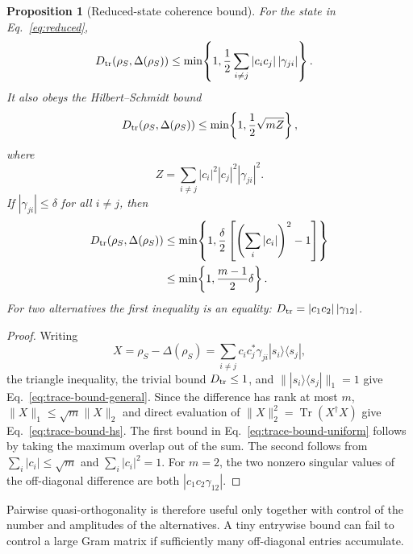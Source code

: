 \documentclass[aps,pra,reprint,superscriptaddress,nofootinbib,longbibliography]{revtex4-2}
\newtheorem{proposition}{Proposition}
\newcommand{\bra}[1]{\langle #1 |}
\newcommand{\ket}[1]{| #1 \rangle}
\newcommand{\Tr}{\operatorname{Tr}}
\begin{document}
\begin{proposition}[Reduced-state coherence bound]
\label{prop:trace-bound}
For the state in Eq.~\eqref{eq:reduced},
\begin{align}
 D_{\rm tr}\!\left(\rho_S,\Delta(\rho_S)\right)
 &\leq
 \min\!\left\{1,
 \frac12\sum_{i\neq j}|c_i c_j|\,|\gamma_{ji}|\right\}.
 \label{eq:trace-bound-general}
\end{align}
It also obeys the Hilbert--Schmidt bound
\begin{equation}
 D_{\rm tr}\!\left(\rho_S,\Delta(\rho_S)\right)
 \leq \min\!\left\{1,\frac12\sqrt{mZ}\right\},
 \label{eq:trace-bound-hs}
\end{equation}
where
\begin{equation}
 Z=\sum_{i\neq j}|c_i|^2|c_j|^2|\gamma_{ji}|^2.
 \label{eq:collective-coherence}
\end{equation}
If $|\gamma_{ji}|\leq\delta$ for all $i\neq j$, then
\begin{equation}
\begin{aligned}
 D_{\rm tr}\!\left(\rho_S,\Delta(\rho_S)\right)
 &\leq
 \min\!\left\{1,\frac{\delta}{2}
 \left[\left(\sum_i|c_i|\right)^2-1\right]
 \right\} \\
 &\leq \min\!\left\{1,\frac{m-1}{2}\delta\right\}.
 \label{eq:trace-bound-uniform}
\end{aligned}
\end{equation}
For two alternatives the first inequality is an equality:
$D_{\rm tr}=|c_1c_2|\,|\gamma_{12}|$.
\end{proposition}

\begin{proof}
Writing
\begin{equation}
 X=\rho_S-\Delta(\rho_S)
 =\sum_{i\neq j}c_ic_j^*\gamma_{ji}\ket{s_i}\bra{s_j},
\end{equation}
the triangle inequality, the trivial bound $D_{\rm tr}\leq1$, and
$\|\ket{s_i}\bra{s_j}\|_1=1$ give
Eq.~\eqref{eq:trace-bound-general}.  Since the difference has rank at most
$m$, $\|X\|_1\leq\sqrt{m}\|X\|_2$ and direct evaluation of
$\|X\|_2^2=\Tr(X^\dagger X)$ give
Eq.~\eqref{eq:trace-bound-hs}.  The first bound in
Eq.~\eqref{eq:trace-bound-uniform} follows by taking the maximum overlap out
of the sum.  The second follows from
$\sum_i|c_i|\leq\sqrt{m}$ and $\sum_i|c_i|^2=1$.
For $m=2$, the two nonzero singular values of the off-diagonal difference are
both $|c_1c_2\gamma_{12}|$.
\end{proof}

Pairwise quasi-orthogonality is therefore useful only together with control
of the number and amplitudes of the alternatives.  A tiny entrywise bound can
fail to control a large Gram matrix if sufficiently many off-diagonal entries
accumulate.
\end{document}
